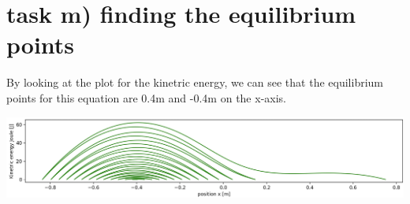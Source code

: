 \documentclass{article}
\begin{document}
    \section*{task m) finding the equilibrium points}
    By looking at the plot for the kinetric energy, we can see that the equilibrium points for this equation 
    are 0.4m and -0.4m on the x-axis. \linebreak
    \begin{center}
        \includegraphics[scale=0.4]{../balance.png}
    \end{center}
\end{document}
